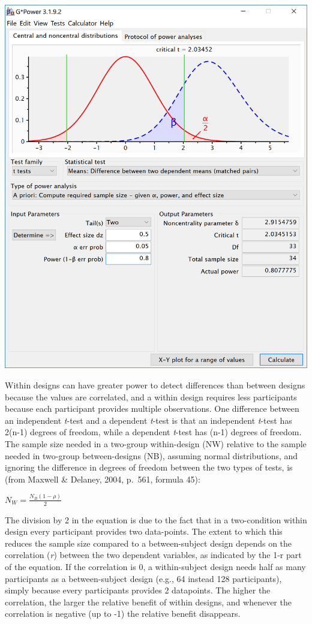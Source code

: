 \documentclass[]{book}
\begin{document}
\includegraphics{screenshots/gpower_9.png}

Within designs can have greater power to detect differences than between designs because the values are correlated, and a within design requires less participants because each participant provides multiple observations. One difference between an independent \emph{t}-test and a dependent \emph{t}-test is that an independent \emph{t}-test has 2(n-1) degrees of freedom, while a dependent \emph{t}-test has (n-1) degrees of freedom. The sample size needed in a two-group within-design (NW) relative to the sample needed in two-group between-designs (NB), assuming normal distributions, and ignoring the difference in degrees of freedom between the two types of tests, is (from Maxwell \& Delaney, 2004, p.~561, formula 45):

\(N_{W}=\frac{N_{B}(1-\rho)}{2}\)

The division by 2 in the equation is due to the fact that in a two-condition within design every participant provides two data-points. The extent to which this reduces the sample size compared to a between-subject design depends on the correlation (\emph{r}) between the two dependent variables, as indicated by the 1-r part of the equation. If the correlation is 0, a within-subject design needs half as many participants as a between-subject design (e.g., 64 instead 128 participants), simply because every participants provides 2 datapoints. The higher the correlation, the larger the relative benefit of within designs, and whenever the correlation is negative (up to -1) the relative benefit disappears.
\end{document}
